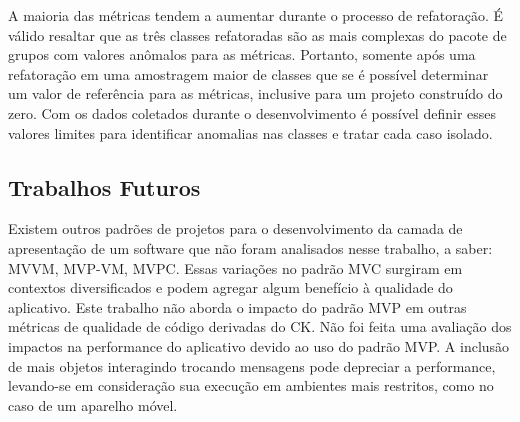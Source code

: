 \documentclass[conference]{IEEEtran}
\begin{document}
A maioria das métricas tendem a aumentar durante o processo de refatoração. 
É válido resaltar que as três classes refatoradas são as mais complexas do
pacote de grupos com valores anômalos para as métricas. Portanto, somente após
uma refatoração em uma amostragem maior de classes que se é possível determinar
um valor de referência para as métricas, inclusive para um projeto construído
do zero. Com os dados coletados durante o desenvolvimento é possível definir
esses valores limites para identificar anomalias nas classes e tratar cada caso
isolado.

 
\subsection{Trabalhos Futuros}

Existem outros padrões de projetos para o desenvolvimento da camada de
apresentação de um software que não foram analisados nesse trabalho, a saber: 
MVVM, MVP-VM, MVPC. Essas variações no padrão MVC surgiram em contextos
diversificados e podem agregar algum benefício à qualidade do aplicativo.
Este trabalho não aborda o impacto do padrão MVP em outras métricas de qualidade
de código derivadas do CK.
Não foi feita uma avaliação dos impactos na performance do aplicativo devido ao
uso do padrão MVP. A inclusão de mais objetos interagindo trocando mensagens
pode depreciar a performance, levando-se em consideração sua execução em
ambientes mais restritos, como no caso de um aparelho móvel.
%







%
\end{document}
